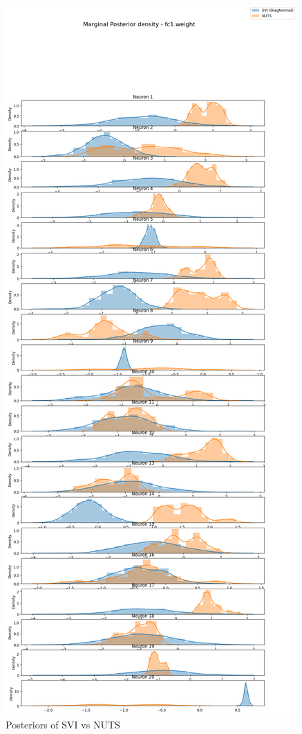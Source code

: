 \documentclass[11pt,a4paper]{article}
\begin{document}
\begin{figure}[h!]
    \centering
    \includegraphics[scale=0.25]{posteriors.png}
    \caption{Posteriors of SVI vs NUTS}
    \label{fig:posteriors}
\end{figure}
\end{document}
